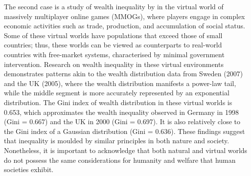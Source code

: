 The second case is a study of wealth inequality by \textcite{fuchs2014behavioral} in the virtual world of massively multiplayer online games (MMOGs), where players engage in complex economic activities such as trade, production, and accumulation of social status. Some of these virtual worlds have populations that exceed those of small countries; thus, these worlds can be viewed as counterparts to real-world countries with free-market systems, characterised by minimal government intervention. Research on wealth inequality in these virtual environments demonstrates patterns akin to the wealth distribution data from Sweden (2007) and the UK (2005), where the wealth distribution manifests a power-law tail, while the middle segment is more accurately represented by an exponential distribution. The Gini index of wealth distribution in these virtual worlds is 0.653, which approximates the wealth inequality observed in Germany in 1998 (Gini = 0.667) and the UK in 2000 (Gini = 0.697). It is also relatively close to the Gini index of a Gaussian distribution (Gini = 0.636). These findings suggest that inequality is moulded by similar principles in both nature and society. Nonetheless, it is important to acknowledge that both natural and virtual worlds do not possess the same considerations for humanity and welfare that human societies exhibit.

